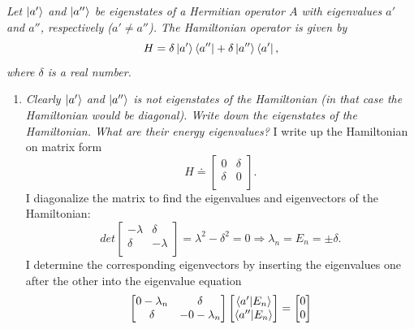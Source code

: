 \begin{example}
	\emph{Let $\ket{a'}$ and $\ket{a''}$ be eigenstates of a Hermitian operator $A$ with eigenvalues $a'$ and $a''$, respectively ($a'\neq a''$). The Hamiltonian operator is given by}	
	\begin{equation}
		H=\delta\ket{a'}\bra{a''}+\delta\ket{a''}\bra{a'},
	\end{equation} 
	\emph{where $\delta$ is a real number.}
	\begin{enumerate}
		\item \emph{Clearly $\ket{a'}$ and $\ket{a''}$ is not eigenstates of the Hamiltonian (in that case the Hamiltonian would be diagonal). Write down the eigenstates of the Hamiltonian. What are their energy eigenvalues?}\newline
		I write up the Hamiltonian on matrix form
		\begin{equation}
			H\doteq\begin{bmatrix}
				0 & \delta  \\
				\delta & 0\\
			\end{bmatrix}.
		\end{equation} 
		I diagonalize the matrix to find the eigenvalues and eigenvectors of the Hamiltonian:
		\begin{equation}
			det\begin{bmatrix}
				-\lambda & \delta  \\
				\delta & -\lambda\\
			\end{bmatrix}=\lambda^2-\delta^2=0 \Rightarrow \lambda_n=E_n=\pm\delta.
		\end{equation} 
		I determine the corresponding eigenvectors by inserting the eigenvalues one after the other into the eigenvalue equation
		\begin{equation}
			\begin{bmatrix}
				0-\lambda_n & \delta\\
				\delta & -0 -\lambda_n\\
			\end{bmatrix}
			\begin{bmatrix}
				\braket{a'|E_n}\\
				\braket{a''|E_n}\\
			\end{bmatrix}
			=\begin{bmatrix}
				0\\
				0\\

\end{bmatrix}
\end{equation}
\end{enumerate}
\end{example}
